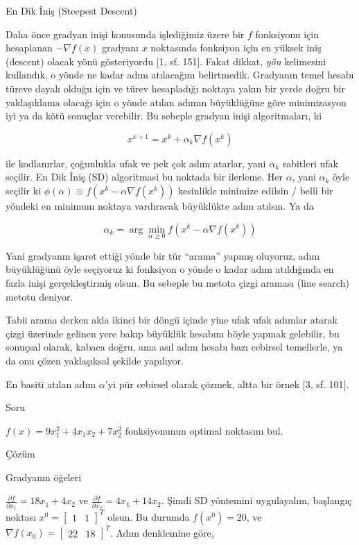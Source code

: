 \documentclass[12pt,fleqn]{article}\usepackage{../../common}
\begin{document}
En Dik İniş (Steepest Descent)

Daha önce gradyan inişi konusunda işlediğimiz üzere bir $f$ fonksiyonu için
hesaplanan $-\nabla f(x)$ gradyanı $x$ noktasında fonksiyon için en yüksek
iniş (descent) olacak yönü gösteriyordu [1, sf. 151]. Fakat dikkat, {\em
  yön} kelimesini kullandık, o yönde ne kadar adım atılacağını
belirtmedik. Gradyanın temel hesabı türeve dayalı olduğu için ve türev
hesapladığı noktaya yakın bir yerde doğru bir yaklaşıklama olacağı için o
yönde atılan adımın büyüklüğüne göre minimizasyon iyi ya da kötü sonuçlar
verebilir. Bu sebeple gradyan inişi algoritmaları, ki

$$
x^{x+1} = x^k + \alpha_k \nabla f(x^k)
$$

ile kodlanırlar, çoğunlukla ufak ve pek çok adım atarlar, yani $\alpha_k$
sabitleri ufak seçilir. En Dik İniş (SD) algoritmasi bu noktada bir
ilerleme. Her $\alpha$, yani $\alpha_k$ öyle seçilir ki
$\phi(\alpha) \equiv f(x^k - \alpha \nabla f(x^k))$ kesinlikle minimize
edilsin / belli bir yöndeki en minimum noktaya vardıracak büyüklükte adım
atılsın. Ya da

$$
\alpha_k = \arg\min_{\alpha \ge 0} f(x^k - \alpha \nabla f(x^k))
$$

Yani gradyanın işaret ettiği yönde bir tür ``arama'' yapmış oluyoruz, adım
büyüklüğünü öyle seçiyoruz ki fonksiyon o yönde o kadar adım atıldığında en
fazla inişi gerçekleştirmiş olsun. Bu sebeple bu metota çizgi araması (line
search) metotu deniyor.

Tabii arama derken akla ikinci bir döngü içinde yine ufak ufak adımlar
atarak çizgi üzerinde gelinen yere bakıp büyüklük hesabını böyle yapmak
gelebilir, bu sonuçsal olarak, kabaca doğru, ama asıl adım hesabı bazı
cebirsel temellerle, ya da onu çözen yaklaşıksal şekilde yapılıyor. 

En basiti atılan adım $\alpha$'yi pür cebirsel olarak çözmek, altta bir
örnek [3, sf. 101].

Soru

$f(x) = 9x_1^2 + 4x_1x_2 + 7x_2^2$ fonksiyonunun optimal noktasını bul.

Çözüm

Gradyanın öğeleri

$\frac{\partial f}{\partial x_1} = 18 x_1 + 4x_2$ ve 
$\frac{\partial  f}{\partial x_2} = 4 x_1 + 14 x_2$. Şimdi SD yöntemini
uygulayalım, başlangıç noktası $x^0 = [\begin{array}{cc} 1 & 1 \end{array}]^T$
olsun. Bu durumda $f(x^0) = 20$, ve $\nabla f(x_0) = [\begin{array}{cc} 22 & 18 \end{array}]^T$. 
Adım denklemine göre, 
\end{document}
